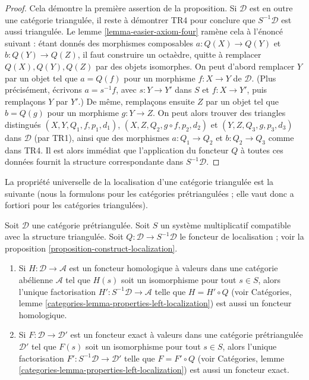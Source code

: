 \begin{proof}
\medskip\noindent
Cela démontre la première assertion de la proposition. Si $\mathcal{D}$ est en
outre une catégorie triangulée, il reste à démontrer TR4 pour conclure que
$S^{-1}\mathcal{D}$ est aussi triangulée. Le lemme
\ref{lemma-easier-axiom-four} ramène cela à l'énoncé suivant : étant donnés des
morphismes composables $a : Q(X) \to Q(Y)$ et $b : Q(Y) \to Q(Z)$, il faut
construire un octaèdre, quitte à remplacer $Q(X), Q(Y), Q(Z)$ par des objets
isomorphes. On peut d'abord remplacer $Y$ par un objet tel que
$a = Q(f)$ pour un morphisme $f : X \to Y$ de $\mathcal{D}$. (Plus précisément,
écrivons $a = s^{-1}f$, avec $s : Y \to Y'$ dans $S$ et $f : X \to Y'$, puis
remplaçons $Y$ par $Y'$.) De même, remplaçons ensuite $Z$ par un objet tel que
$b = Q(g)$ pour un morphisme $g : Y \to Z$. On peut alors trouver des triangles
distingués
$(X, Y, Q_1, f, p_1, d_1)$,
$(X, Z, Q_2, g \circ f, p_2, d_2)$ et
$(Y, Z, Q_3, g, p_3, d_3)$ dans $\mathcal{D}$ (par TR1), ainsi que des morphismes
$a : Q_1 \to Q_2$ et $b : Q_2 \to Q_3$ comme dans TR4.
Il est alors immédiat que l'application du foncteur $Q$ à toutes ces données
fournit la structure correspondante dans $S^{-1}\mathcal{D}$.
\end{proof}

\noindent
La propriété universelle de la localisation d'une catégorie triangulée est la
suivante (nous la formulons pour les catégories prétriangulées ; elle vaut donc
a fortiori pour les catégories triangulées).

\begin{lemma}
\label{lemma-universal-property-localization}
Soit $\mathcal{D}$ une catégorie prétriangulée. Soit $S$ un système
multiplicatif compatible avec la structure triangulée. Soit
$Q : \mathcal{D} \to S^{-1}\mathcal{D}$ le foncteur de localisation ; voir la
proposition \ref{proposition-construct-localization}.
\begin{enumerate}
\item Si $H : \mathcal{D} \to \mathcal{A}$ est un foncteur homologique à
valeurs dans une catégorie abélienne $\mathcal{A}$ tel que $H(s)$ soit un
isomorphisme pour tout $s \in S$, alors l'unique factorisation
$H' : S^{-1}\mathcal{D} \to \mathcal{A}$ telle que $H = H' \circ Q$ (voir
Catégories, lemme \ref{categories-lemma-properties-left-localization}) est aussi
un foncteur homologique.
\item Si $F : \mathcal{D} \to \mathcal{D}'$ est un foncteur exact à valeurs
dans une catégorie prétriangulée $\mathcal{D}'$ tel que $F(s)$ soit un
isomorphisme pour tout $s \in S$, alors l'unique factorisation
$F' : S^{-1}\mathcal{D} \to \mathcal{D}'$ telle que $F = F' \circ Q$ (voir
Catégories, lemme \ref{categories-lemma-properties-left-localization}) est aussi
un foncteur exact.
\end{enumerate}
\end{lemma}

